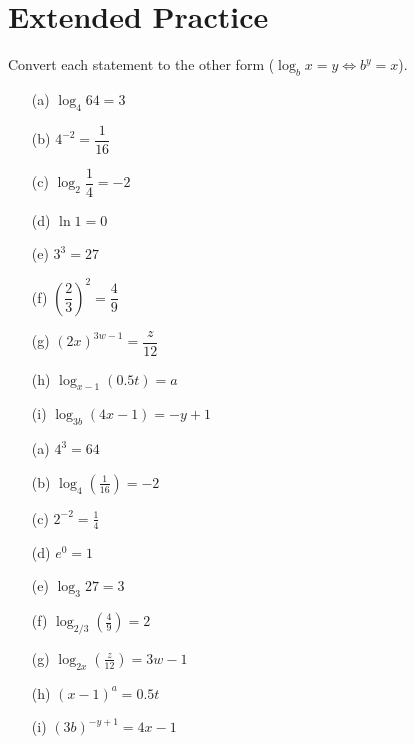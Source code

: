 \documentclass{ximera}
\begin{document}
\bigskip
\section*{Extended Practice}

\begin{problem}
Convert each statement to the other form ($\log_b x = y \Longleftrightarrow b^y = x$).
\begin{enumerate}
  \item[(a)] $\log_4 64 = 3$
  \item[(b)] $4^{-2} = \dfrac{1}{16}$
  \item[(c)] $\log_2 \dfrac{1}{4} = -2$
  \item[(d)] $\ln 1 = 0$
  \item[(e)] $3^3 = 27$
  \item[(f)] $\left(\dfrac{2}{3}\right)^2 = \dfrac{4}{9}$
  \item[(g)] $(2x)^{3w-1} = \dfrac{z}{12}$
  \item[(h)] $\log_{x-1}(0.5t) = a$
  \item[(i)] $\log_{3b}(4x-1) = -y+1$
\end{enumerate}

\begin{solution}
\begin{enumerate}
  \item[(a)] $4^3 = 64$
  \item[(b)] $\log_4\!\left(\tfrac{1}{16}\right) = -2$
  \item[(c)] $2^{-2} = \tfrac{1}{4}$
  \item[(d)] $e^0 = 1$
  \item[(e)] $\log_3 27 = 3$
  \item[(f)] $\log_{2/3}\!\left(\tfrac{4}{9}\right) = 2$
  \item[(g)] $\log_{2x}\!\left(\tfrac{z}{12}\right) = 3w-1$
  \item[(h)] $(x-1)^a = 0.5t$
  \item[(i)] $(3b)^{-y+1} = 4x-1$
\end{enumerate}
\end{solution}
\end{problem}
\end{document}

